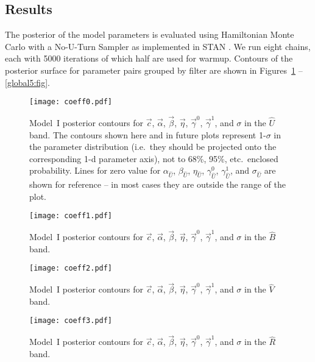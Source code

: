 \documentclass{aastex61}   	%
\begin{document}
 
\subsection{Results}
\label{results:sec}
The posterior of the model parameters is evaluated using Hamiltonian Monte Carlo with a No-U-Turn
Sampler as implemented in
STAN \citep{stan}.  We run eight chains, each with 5000 iterations of which
half are used for warmup.
Contours of the posterior surface for parameter pairs grouped by filter are shown in Figures~\ref{global1:fig} -- \ref{global5:fig}.


\begin{figure}[htbp] %
   \centering
   \texttt{[image: coeff0.pdf]} 
            \caption{Model~I posterior contours for $\vec{c}$, $\vec{\alpha}$, $\vec{\beta}$, $\vec{\eta}$, $\vec{\gamma}^0$, $\vec{\gamma}^1$, and $\sigma$ in the ${\hat{U}}$ band.
            The contours shown here and in future plots represent 1-$\sigma$ in the parameter distribution (i.e.\ they should be
            projected onto the corresponding 1-d parameter axis), not to 68\%, 95\%, etc.\
            enclosed probability.  Lines for zero value for $\alpha_{\hat{U}}$, $\beta_{\hat{U}}$, $\eta_{\hat{U}}$, $\gamma_{\hat{U}}^0$, $\gamma_{\hat{U}}^1$, and $\sigma_{\hat{U}}$ are shown for reference --
            in most cases they are outside the range of the plot.
            \label{global1:fig}}
\end{figure}

\begin{figure}[htbp] %
   \centering
   \texttt{[image: coeff1.pdf]} 
            \caption{Model~I posterior contours for $\vec{c}$, $\vec{\alpha}$, $\vec{\beta}$, $\vec{\eta}$,  $\vec{\gamma}^0$, $\vec{\gamma}^1$, and $\sigma$ in the ${\hat{B}}$ band.
 \label{global2:fig}}
\end{figure}

\begin{figure}[htbp] %
   \centering
   \texttt{[image: coeff2.pdf]} 
            \caption{Model~I posterior contours for $\vec{c}$, $\vec{\alpha}$, $\vec{\beta}$, $\vec{\eta}$, $\vec{\gamma}^0$, $\vec{\gamma}^1$, and $\sigma$ in the ${\hat{V}}$ band.
 \label{global3:fig}}
\end{figure}

\begin{figure}[htbp] %
   \centering
      \texttt{[image: coeff3.pdf]} 
            \caption{Model~I posterior contours for  $\vec{c}$, $\vec{\alpha}$, $\vec{\beta}$, $\vec{\eta}$,  $\vec{\gamma}^0$, $\vec{\gamma}^1$, and $\sigma$ in the ${\hat{R}}$ band.
 \label{global4:fig}}
\end{figure}
\end{document}
